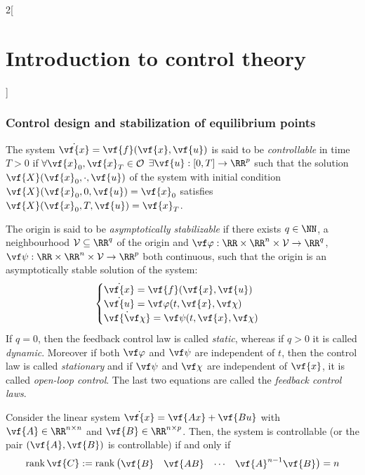 \documentclass[../../../main_math.tex]{subfiles}
\begin{document}
\begin{multicols}{2}[\section{Introduction to control theory}]
  \subsubsection{Control design and stabilization of equilibrium points}
  \begin{definition}
    The system $\dot{\vf{x}} = \vf{f}(\vf{x}, \vf{u})$ is said to be \emph{controllable} in time $T>0$ if $\forall \vf{x}_0, \vf{x}_T\in \mathcal{O}$ $\exists \vf{u}: [0, T]\to \RR^p$ such that the solution $\vf{X}(\vf{x}_0,\cdot, \vf{u})$ of the system with initial condition $\vf{X}(\vf{x}_0, 0,\vf{u}) = \vf{x}_0$ satisfies $\vf{X}(\vf{x}_0, T,\vf{u}) = \vf{x}_T$.
  \end{definition}
  \begin{definition}
    The origin is said to be \emph{asymptotically stabilizable} if there exists $q\in \NN$, a neighbourhood $\mathcal{V}\subseteq \RR^q$ of the origin and $\vf\varphi:\RR\times\RR^n\times\mathcal{V}\to \RR^q$, $\vf\psi:\RR\times\RR^n\times\mathcal{V}\to \RR^p$ both continuous, such that the origin is an asymptotically stable solution of the system:
    \begin{equation}\label{ICT:augmented_system}
      \begin{cases}
        \dot{\vf{x}} = \vf{f}(\vf{x}, \vf{u})         \\
        \dot{\vf{u}} = \vf\varphi(t, \vf{x}, \vf\chi) \\
        \dot{\vf{\vf\chi}} = \vf\psi(t, \vf{x}, \vf\chi)
      \end{cases}
    \end{equation}
    If $q=0$, then the feedback control law is called \emph{static}, whereas if $q>0$ it is called \emph{dynamic}. Moreover if both $\vf\varphi$ and $\vf\psi$ are independent of $t$, then the control law is called \emph{stationary} and if $\vf\psi$ and $\vf\chi$ are independent of $\vf{x}$, it is called \emph{open-loop control}. The last two equations are called the \emph{feedback control laws}.
  \end{definition}
  \begin{theorem}
    Consider the linear system $\dot{\vf{x}} = \vf{Ax} + \vf{Bu}$ with $\vf{A}\in \RR^{n\times n}$ and $\vf{B}\in \RR^{n\times p}$. Then, the system is controllable (or the pair $(\vf{A},\vf{B})$ is controllable) if and only if
    $$
      \rank\vf{C}:=\rank\begin{pmatrix} \vf{B} & \vf{AB} & \cdots & \vf{A}^{n-1}\vf{B} \end{pmatrix} = n
$$
\end{theorem}
\end{multicols}
\end{document}
